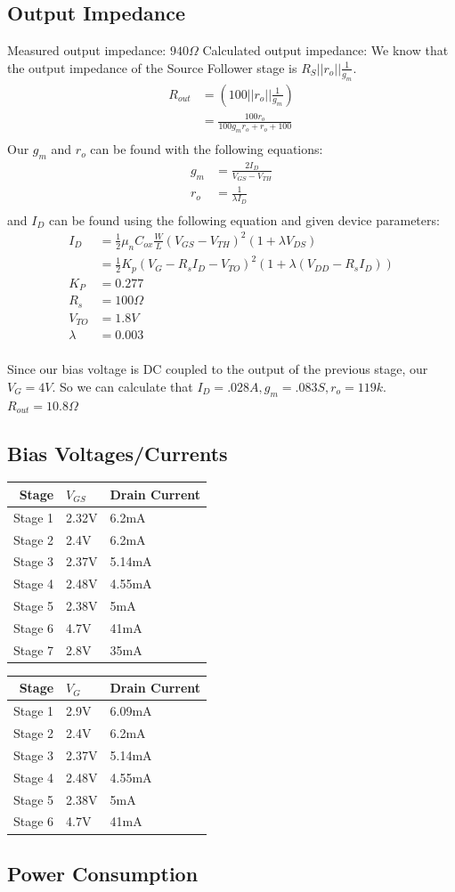 \documentclass[11pt, twoside, letterpaper]{article}
\begin{document}
\subsection*{Output Impedance}
Measured output impedance: $940 \Omega$
Calculated output impedance:
We know that the output impedance of the Source Follower stage is $R_S || r_o || \frac{1}{g_m}$.
\begin{align*}
	R_{out} &= (100 || r_o || \frac{1}{g_m}) \\
	&= \frac{100r_o}{100g_m r_o + r_o + 100} \\
\end{align*}
Our $g_m$ and $r_o$ can be found with the following equations:
\begin{align*}
	g_m &= \frac{2 I_D}{V_{GS} - V_{TH}} \\
	r_o &= \frac{1}{\lambda I_D} \\
\end{align*}
and $I_D$ can be found using the following equation and given device parameters: 
\begin{align*}
	I_D &= \frac{1}{2} \mu_n C_{ox} \frac{W}{L}(V_{GS} -V_{TH})^2 (1+\lambda V_{DS}) \\
	&= \frac{1}{2}K_p (V_G - R_s I_D - V_{TO})^2 (1+ \lambda (V_{DD} - R_s I_D)) \\
	K_P &= 0.277 \\
	R_s &= 100 \Omega \\
	V_{TO} &= 1.8 V \\
	\lambda &= 0.003 \\
\end{align*}

Since our bias voltage is DC coupled to the output of the previous stage, our $V_G = 4 V$. 
So we can calculate that $I_D = .028 A, g_m = .083 S, r_o = 119k$. $R_{out} = 10.8 \Omega$
\subsection*{Bias Voltages/Currents}
\begin{tabular}{|r|l|l|}
\hline
Stage & $V_{GS}$ & Drain Current\\
\hline
Stage 1 &2.32V&6.2mA\\
Stage 2 &2.4V&6.2mA\\
Stage 3 &2.37V&5.14mA\\
Stage 4 &2.48V&4.55mA\\
Stage 5 &2.38V&5mA\\%
Stage 6 &4.7V&41mA\\
Stage 7 &2.8V&35mA\\
\hline
\end{tabular}

\begin{tabular}{|r|l|l|}
\hline
Stage & $V_{G}$ & Drain Current\\
\hline
Stage 1 &2.9V&6.09mA\\
Stage 2 &2.4V&6.2mA\\
Stage 3 &2.37V&5.14mA\\
Stage 4 &2.48V&4.55mA\\
Stage 5 &2.38V&5mA\\
Stage 6 &4.7V&41mA\\
\hline
\end{tabular}

\subsection*{Power Consumption}
\end{document}
